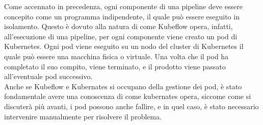 Come accennato in precedenza, ogni componente di una pipeline
deve essere concepito come un programma indipendente, il quale
può essere eseguito in isolamento.
Questo è dovuto alla natura di come Kubeflow opera, infatti,
all'esecuzione di una pipeline, per ogni componente viene creato
un pod di Kubernetes. Ogni pod viene eseguito su un nodo del cluster di Kubernetes
il quale può essere una macchina fisica o virtuale.
Una volta che il pod ha completato il suo compito, viene terminato, e
il prodotto viene passato all'eventuale pod successivo.\\

Anche se Kubeflow e Kubernates si occupano della gestione dei pod,
è stato fondamentale avere una conoscenza di come kubernates opera, siccome
come si discuterà più avanti, i pod possono anche fallire,
e in quel caso, è stato necessario intervenire manualmente
per risolvere il problema.




